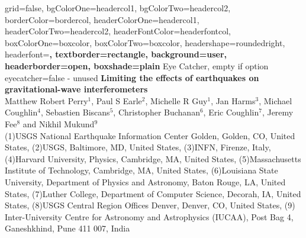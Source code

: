 \documentclass[a0paper,portrait]{baposter}
\begin{document}

\background{
}

\begin{poster}{
	grid=false,
	bgColorOne=headercol1,
	bgColorTwo=headercol2,
	borderColor=bordercol,
	headerColorOne=headercol1,
	headerColorTwo=headercol2,
	headerFontColor=headerfontcol,
	boxColorOne=boxcolor,
	boxColorTwo=boxcolor,
	headershape=roundedright,
	headerfont=\Large\sf\bf,
	textborder=rectangle,
	background=user,
	headerborder=open,
  boxshade=plain
}
{
	Eye Catcher, empty if option eyecatcher=false - unused
}
{   {\LARGE
}
}
{   {\large \bf
	Limiting the effects of earthquakes on gravitational-wave interferometers \\
	}
    {\small
	Matthew Robert Perry$^1$, Paul S Earle$^2$, Michelle R Guy$^1$, Jan Harms$^3$, Michael Coughlin$^4$, Sebastien Biscans$^5$, Christopher Buchanan$^6$, Eric Coughlin$^7$, Jeremy Fee$^8$ and Nikhil Mukund$^9$}\\
	{\tiny (1)USGS National Earthquake Information Center Golden, Golden, CO, United States, (2)USGS, Baltimore, MD, United States, (3)INFN, Firenze, Italy, (4)Harvard University, Physics, Cambridge, MA, United States, (5)Massachusetts Institute of Technology, Cambridge, MA, United States, (6)Louisiana State University, Department of Physics and Astronomy, Baton Rouge, LA, United States, (7)Luther College, Department of Computer Science, Decorah, IA, United States, (8)USGS Central Region Offices Denver, Denver, CO, United States, (9) Inter-University Centre for Astronomy and Astrophysics (IUCAA), Post Bag 4, Ganeshkhind, Pune 411 007, India
}}
\end{poster}
\end{document}
